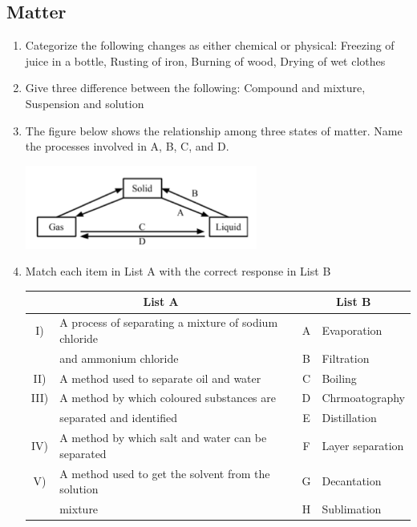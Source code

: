 \subsection{Matter}

\begin{enumerate}
	\item Categorize the following changes as either chemical or physical: Freezing of juice in a bottle, Rusting of iron, Burning of wood, Drying of wet clothes
	
	\item Give three difference between the following: Compound and mixture, Suspension and solution
	
	\item The figure below shows the relationship among three states of matter. Name the processes involved in A, B, C, and D.
	\vspace*{-7mm}
	\begin{center}
		\includegraphics[width=0.6\textwidth]{./img/chem_I_matter_1.png}
	\end{center}
	
	\item Match each item in List A with the correct response in List B
	\begin{center}
		\begin{tabular}{|cp{8cm}|cp{3cm}|} \hline
			\multicolumn{2}{|c|}{List A} & \multicolumn{2}{|c|}{List B} \\ \hline
			I) & A process of separating a mixture of sodium chloride & A & Evaporation \\ 
			&  and ammonium chloride & B & Filtration \\
			II) & A method used to separate oil and water & C & Boiling \\
			III) & A method by which coloured substances are & D & Chrmoatography \\
			&  separated and identified & E & Distillation \\
			IV) & A method by which salt and water can be separated & F & Layer separation \\
			V) &  A method used to get the solvent from the solution & G & Decantation \\ 
			&  mixture & H & Sublimation \\ \hline
		\end{tabular}
	\end{center}
	

\end{enumerate}
